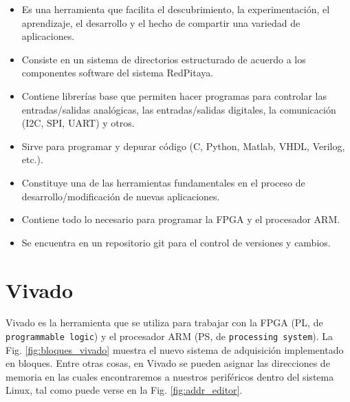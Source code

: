 \documentclass[a4paper,11pt]{article}
\begin{document}
\begin{itemize}
  \item Es una herramienta que facilita el descubrimiento, la
        experimentación, el aprendizaje, el desarrollo y el hecho de compartir una
        variedad de aplicaciones.
  \item Consiste en un sistema de directorios estructurado de acuerdo a los
        componentes software del sistema RedPitaya.
  \item Contiene librerías base que permiten hacer programas para controlar las
entradas/salidas analógicas, las entradas/salidas digitales, la comunicación
(I2C, SPI, UART) y otros.
  \item Sirve para programar y depurar código (C, Python, Matlab, VHDL,
        Verilog, etc.).
  \item Constituye una de las herramientas fundamentales en el proceso de
        desarrollo/modificación de nuevas aplicaciones.
  \item Contiene todo lo necesario para programar la FPGA y el procesador
        ARM.
  \item Se encuentra en un repositorio git para el control de versiones y
        cambios.

\end{itemize}

\section{Vivado}
Vivado es la herramienta que se utiliza para trabajar con la FPGA (PL, de
\texttt{programmable logic}) y el procesador ARM (PS, de \texttt{processing
system}). La Fig.
\ref{fig:bloques_vivado} muestra el nuevo sistema de adquisición 
implementado en bloques. Entre otras cosas, en
Vivado se pueden asignar las direcciones de memoria en las cuales encontraremos
a nuestros periféricos dentro del sistema Linux, tal como puede verse en la
Fig. \ref{fig:addr_editor}.
\end{document}

